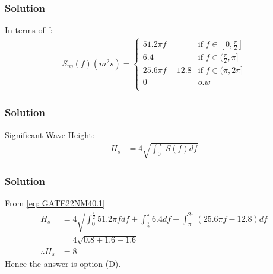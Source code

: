 \documentclass{beamer}
\begin{document}
\begin{frame}
\frametitle{Solution}
In terms of f:
\begin{align}
S_{\eta \eta}(f)(m^2s) = 
\begin{cases}
  51.2\pi f   & \text{if } f \in [0,\frac{\pi}{2}] \\
  6.4  & \text{if } f \in (\frac{\pi}{2},\pi] \\
  25.6\pi f-12.8  & \text{if } f \in (\pi,2\pi] \\
  0 & o.w \\
\end{cases} \label{eq: GATE22NM40.1}
\end{align}
\end{frame}

\begin{frame}
\frametitle{Solution}
Significant Wave Height:
\begin{align}
H_s &= 4 \sqrt{\int_{0}^{\infty} S(f)df}
\end{align}
\end{frame}

\begin{frame}
\frametitle{Solution}
From \eqref{eq: GATE22NM40.1}
\begin{align}
H_s &= 4 \sqrt{\int_{0}^{\frac{\pi}{2}} 51.2\pi fdf + \int_{\frac{\pi}{2}}^{\pi} 6.4df + \int_{\pi}^{2\pi} (25.6\pi f-12.8)df} \\
&= 4 \sqrt{0.8 +1.6 +1.6} \\
\therefore H_s &= 8
\end{align}
Hence the answer is option (D).
\end{frame}
\end{document}

